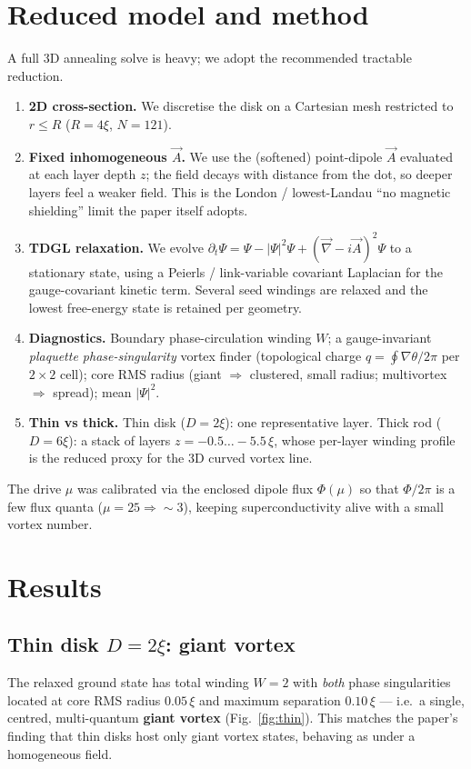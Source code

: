 \documentclass[11pt]{article}
\begin{document}
\section{Reduced model and method}
A full 3D annealing solve is heavy; we adopt the recommended tractable reduction.
\begin{enumerate}
\item \textbf{2D cross-section.} We discretise the disk on a Cartesian mesh
restricted to $r\le R$ ($R=4\xi$, $N=121$).
\item \textbf{Fixed inhomogeneous $\vec A$.} We use the (softened) point-dipole
$\vec A$ evaluated at each layer depth $z$; the field decays with distance from
the dot, so deeper layers feel a weaker field. This is the London / lowest-Landau
``no magnetic shielding'' limit the paper itself adopts.
\item \textbf{TDGL relaxation.} We evolve
$\partial_t\Psi=\Psi-|\Psi|^2\Psi+(\vec\nabla-i\vec A)^2\Psi$ to a stationary
state, using a Peierls / link-variable covariant Laplacian for the gauge-covariant
kinetic term. Several seed windings are relaxed and the lowest free-energy state
is retained per geometry.
\item \textbf{Diagnostics.} Boundary phase-circulation winding $W$; a
gauge-invariant \emph{plaquette phase-singularity} vortex finder (topological
charge $q=\oint\nabla\theta/2\pi$ per $2\times2$ cell); core RMS radius (giant
$\Rightarrow$ clustered, small radius; multivortex $\Rightarrow$ spread);
mean $|\Psi|^2$.
\item \textbf{Thin vs thick.} Thin disk ($D=2\xi$): one representative layer.
Thick rod ($D=6\xi$): a stack of layers $z=-0.5\ldots-5.5\,\xi$, whose per-layer
winding profile is the reduced proxy for the 3D curved vortex line.
\end{enumerate}
The drive $\mu$ was calibrated via the enclosed dipole flux $\Phi(\mu)$ so that
$\Phi/2\pi$ is a few flux quanta ($\mu=25 \Rightarrow \sim3$), keeping
superconductivity alive with a small vortex number.

\section{Results}
\subsection{Thin disk $D=2\xi$: giant vortex}
The relaxed ground state has total winding $W=2$ with \emph{both} phase
singularities located at core RMS radius $0.05\,\xi$ and maximum separation
$0.10\,\xi$ --- i.e.\ a single, centred, multi-quantum \textbf{giant vortex}
(Fig.~\ref{fig:thin}). This matches the paper's finding that thin disks host only
giant vortex states, behaving as under a homogeneous field.
\end{document}
